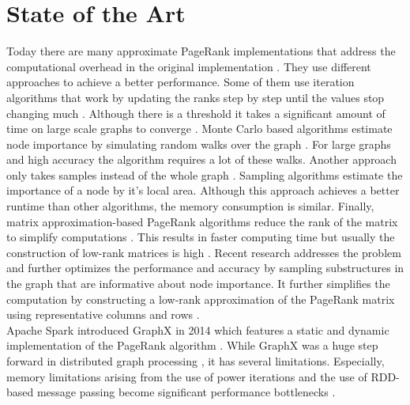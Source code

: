 \documentclass[a4paper,12pt]{article}
\begin{document}
\section{State of the Art}
Today there are many approximate PageRank implementations that address the computational overhead in the original implementation \cite{wu_efficient_2024}. They use different approaches to achieve a better performance. Some of them use iteration algorithms that work by updating the ranks step by step until the values stop changing much \cite{xie_parameterized_2023}\cite{anikin_efficient_2022}. Although there is a threshold it takes a significant amount of time on large scale graphs to converge \cite{wu_efficient_2024}. Monte Carlo based algorithms estimate node importance by simulating random walks over the graph \cite{avrachenkov_monte_2007}. For large graphs and high accuracy the algorithm requires a lot of these walks. Another approach only takes samples instead of the whole graph \cite{wu_approxrank_2009}\cite{bar-yossef_local_2008}. Sampling algorithms estimate the importance of a node by it's local area. Although this approach achieves a better runtime than other algorithms, the memory consumption is similar. Finally, matrix approximation-based PageRank algorithms reduce the rank of the matrix to simplify computations \cite{liu_fast_2015}. This results in faster computing time but usually the construction of low-rank matrices is high . Recent research addresses the problem and further optimizes the performance and accuracy by sampling substructures in the graph that are informative about node importance. It further simplifies the computation by constructing a low-rank approximation of the PageRank matrix using representative columns and rows \cite{wu_efficient_2024}. \\Apache Spark introduced GraphX in 2014 which features a static and dynamic implementation of the PageRank algorithm \cite{xin_graphx_2013}. While GraphX was a huge step forward in distributed graph processing \cite{gonzalez_graphx_2014-1}, it has several limitations. %
Especially, memory limitations arising from the use of power iterations \cite{page_pagerank_1999} and the use of RDD-based message passing become significant performance bottlenecks \cite{xin_graphx_2014}\cite{xin_graphx_2013}.
 
\end{document}
